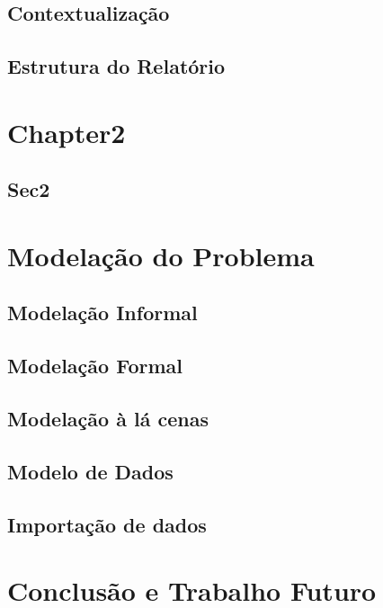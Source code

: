 \documentclass[english,a4paper]{report}
\begin{document}
\section{Contextualização}

\section{Estrutura do Relatório}

\newpage
\chapter{Chapter2} \label{chap xxx}

\section{Sec2}
\label{sec yyy}
\newpage
\chapter{Modelação do Problema} \label{chap modprob}

\section{Modelação Informal}
\label{sec modinf}
\section{Modelação Formal}
\label{sec modfor}
\section{Modelação à lá cenas}
\label{sec modcenas}
\section{Modelo de Dados}
\label{sec modedados}
\section{Importação de dados}
\label{sec xml}
\newpage
\chapter{Conclusão e Trabalho Futuro}\label{chap con} 

\newpage

%

\end{document}
